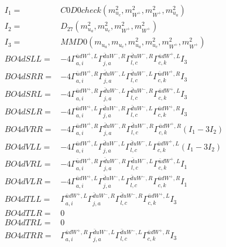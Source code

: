 \documentclass[A4,landscape]{article}
\begin{document}
\begin{align} 
I_1 = & C0D0check(m^2_{u_{{c}}}, m^2_{W^+}, m^2_{W^+}, m^2_{u_{{a}}}) \\ 
I_2 = & D_{27}(m^2_{u_{{a}}}, m^2_{u_{{c}}}, m^2_{W^+}, m^2_{W^+}) \\ 
I_3 = & MMD0(m_{u_{{a}}}, m_{u_{{c}}}, m^2_{u_{{a}}}, m^2_{u_{{c}}}, m^2_{W^+}, m^2_{W^+}) \\ 
  BO4dSLL= & -4  \Gamma^{\bar{u}d W^+ ,L}_{a, i} \Gamma^{\bar{d}u W^-,R}_{j, a} \Gamma^{\bar{d}u W^-,R}_{l, c} \Gamma^{\bar{u}d W^+ ,L}_{c, k} I_3 \\ 
  BO4dSRR= & -4  \Gamma^{\bar{u}d W^+ ,R}_{a, i} \Gamma^{\bar{d}u W^-,L}_{j, a} \Gamma^{\bar{d}u W^-,L}_{l, c} \Gamma^{\bar{u}d W^+ ,R}_{c, k} I_3 \\ 
  BO4dSRL= & -4  \Gamma^{\bar{u}d W^+ ,R}_{a, i} \Gamma^{\bar{d}u W^-,L}_{j, a} \Gamma^{\bar{d}u W^-,R}_{l, c} \Gamma^{\bar{u}d W^+ ,L}_{c, k} I_3 \\ 
  BO4dSLR= & -4  \Gamma^{\bar{u}d W^+ ,L}_{a, i} \Gamma^{\bar{d}u W^-,R}_{j, a} \Gamma^{\bar{d}u W^-,L}_{l, c} \Gamma^{\bar{u}d W^+ ,R}_{c, k} I_3 \\ 
  BO4dVRR= & -4  \Gamma^{\bar{u}d W^+ ,R}_{a, i} \Gamma^{\bar{d}u W^-,R}_{j, a} \Gamma^{\bar{d}u W^-,R}_{l, c} \Gamma^{\bar{u}d W^+ ,R}_{c, k} (I_1 - 3 I_2) \\ 
  BO4dVLL= & -4  \Gamma^{\bar{u}d W^+ ,L}_{a, i} \Gamma^{\bar{d}u W^-,L}_{j, a} \Gamma^{\bar{d}u W^-,L}_{l, c} \Gamma^{\bar{u}d W^+ ,L}_{c, k} (I_1 - 3 I_2) \\ 
  BO4dVRL= & -4  \Gamma^{\bar{u}d W^+ ,R}_{a, i} \Gamma^{\bar{d}u W^-,R}_{j, a} \Gamma^{\bar{d}u W^-,L}_{l, c} \Gamma^{\bar{u}d W^+ ,L}_{c, k} I_1 \\ 
  BO4dVLR= & -4  \Gamma^{\bar{u}d W^+ ,L}_{a, i} \Gamma^{\bar{d}u W^-,L}_{j, a} \Gamma^{\bar{d}u W^-,R}_{l, c} \Gamma^{\bar{u}d W^+ ,R}_{c, k} I_1 \\ 
  BO4dTLL= &  \Gamma^{\bar{u}d W^+ ,L}_{a, i} \Gamma^{\bar{d}u W^-,R}_{j, a} \Gamma^{\bar{d}u W^-,R}_{l, c} \Gamma^{\bar{u}d W^+ ,L}_{c, k} I_3 \\ 
  BO4dTLR= & 0 \\ 
  BO4dTRL= & 0 \\ 
  BO4dTRR= &  \Gamma^{\bar{u}d W^+ ,R}_{a, i} \Gamma^{\bar{d}u W^-,L}_{j, a} \Gamma^{\bar{d}u W^-,L}_{l, c} \Gamma^{\bar{u}d W^+ ,R}_{c, k} I_3 \\ 
\end{align} 
\end{document}
